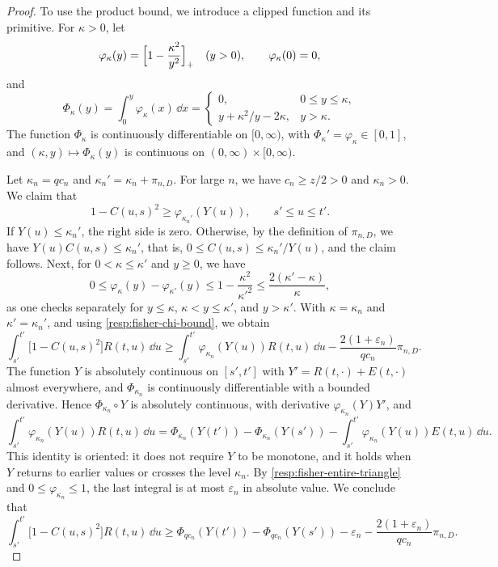 \begin{proof}
To use the product bound, we introduce a clipped function and its primitive. For $\kappa>0$, let
\[
 \varphi_\kappa(y)=\Bigl[1-\frac{\kappa^2}{y^2}\Bigr]_+\quad(y>0),\qquad\varphi_\kappa(0)=0,
\]
and
\[
 \Phi_\kappa(y)=\int_0^y\varphi_\kappa(x)\,\dd x=\begin{cases}0,&0\le y\le\kappa,\\ y+\kappa^2/y-2\kappa,&y>\kappa.\end{cases}
\]
The function $\Phi_\kappa$ is continuously differentiable on $[0,\infty)$, with $\Phi_\kappa'=\varphi_\kappa\in[0,1]$, and $(\kappa,y)\mapsto\Phi_\kappa(y)$ is continuous on $(0,\infty)\times[0,\infty)$.

Let $\kappa_n=qc_n$ and $\kappa_n'=\kappa_n+\pi_{n,D}$. For large $n$, we have $c_n\ge z/2>0$ and $\kappa_n>0$. We claim that
\[
 1-C(u,s)^2\ge\varphi_{\kappa_n'}(Y(u)),\qquad s'\le u\le t'.
\]
If $Y(u)\le\kappa_n'$, the right side is zero. Otherwise, by the definition of $\pi_{n,D}$, we have $Y(u)C(u,s)\le\kappa_n'$, that is, $0\le C(u,s)\le\kappa_n'/Y(u)$, and the claim follows. Next, for $0<\kappa\le\kappa'$ and $y\ge0$, we have
\[
 0\le\varphi_\kappa(y)-\varphi_{\kappa'}(y)\le1-\frac{\kappa^2}{\kappa'^2}\le\frac{2(\kappa'-\kappa)}{\kappa},
\]
as one checks separately for $y\le\kappa$, $\kappa<y\le\kappa'$, and $y>\kappa'$. With $\kappa=\kappa_n$ and $\kappa'=\kappa_n'$, and using \eqref{resp:fisher-chi-bound}, we obtain
\[
 \int_{s'}^{t'}\bigl[1-C(u,s)^2\bigr]R(t,u)\,\dd u
 \ge\int_{s'}^{t'}\varphi_{\kappa_n}(Y(u))R(t,u)\,\dd u-\frac{2(1+\varepsilon_n)}{qc_n}\pi_{n,D} .
\]
The function $Y$ is absolutely continuous on $[s',t']$ with $Y'=R(t,\cdot)+E(t,\cdot)$ almost everywhere, and $\Phi_{\kappa_n}$ is continuously differentiable with a bounded derivative. Hence $\Phi_{\kappa_n}\circ Y$ is absolutely continuous, with derivative $\varphi_{\kappa_n}(Y)Y'$, and
\[
 \int_{s'}^{t'}\varphi_{\kappa_n}(Y(u))R(t,u)\,\dd u
 =\Phi_{\kappa_n}(Y(t'))-\Phi_{\kappa_n}(Y(s'))-\int_{s'}^{t'}\varphi_{\kappa_n}(Y(u))E(t,u)\,\dd u .
\]
This identity is oriented: it does not require $Y$ to be monotone, and it holds when $Y$ returns to earlier values or crosses the level $\kappa_n$. By \eqref{resp:fisher-entire-triangle} and $0\le\varphi_{\kappa_n}\le1$, the last integral is at most $\varepsilon_n$ in absolute value. We conclude that
\begin{equation}
 \int_{s'}^{t'}\bigl[1-C(u,s)^2\bigr]R(t,u)\,\dd u
 \ge\Phi_{qc_n}(Y(t'))-\Phi_{qc_n}(Y(s'))-\varepsilon_n-\frac{2(1+\varepsilon_n)}{qc_n}\pi_{n,D} .
 \label{resp:fisher-bulk-calibration}
\end{equation}


\end{proof}
